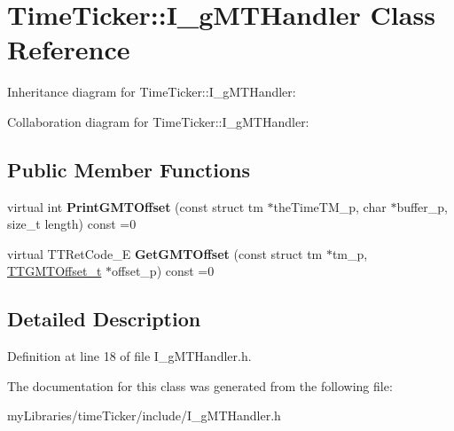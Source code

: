 \hypertarget{classTimeTicker_1_1I__gMTHandler}{}\section{Time\+Ticker\+::I\+\_\+g\+M\+T\+Handler Class Reference}
\label{classTimeTicker_1_1I__gMTHandler}


Inheritance diagram for Time\+Ticker\+::I\+\_\+g\+M\+T\+Handler\+:


Collaboration diagram for Time\+Ticker\+::I\+\_\+g\+M\+T\+Handler\+:
\subsection*{Public Member Functions}
\begin{DoxyCompactItemize}
\item 
\mbox{\label{classTimeTicker_1_1I__gMTHandler_a302f228efe865f23e69ffae680a61fac}} 
virtual int {\bfseries Print\+G\+M\+T\+Offset} (const struct tm $\ast$the\+Time\+T\+M\+\_\+p, char $\ast$buffer\+\_\+p, size\+\_\+t length) const =0
\item 
\mbox{\label{classTimeTicker_1_1I__gMTHandler_a0c44465fa6e5ac13e4a49d0da0749d1d}} 
virtual T\+T\+Ret\+Code\+\_\+E {\bfseries Get\+G\+M\+T\+Offset} (const struct tm $\ast$tm\+\_\+p, \mbox{\hyperlink{structTTGMTOffset}{T\+T\+G\+M\+T\+Offset\+\_\+t}} $\ast$offset\+\_\+p) const =0
\end{DoxyCompactItemize}


\subsection{Detailed Description}


Definition at line 18 of file I\+\_\+g\+M\+T\+Handler.\+h.



The documentation for this class was generated from the following file\+:\begin{DoxyCompactItemize}
\item 
my\+Libraries/time\+Ticker/include/I\+\_\+g\+M\+T\+Handler.\+h\end{DoxyCompactItemize}
